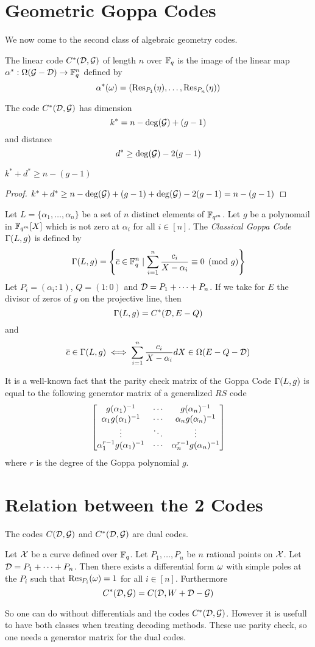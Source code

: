 \section{Geometric Goppa Codes}
We now come to the second class of algebraic geometry codes. 
\begin{definition}
	The linear code $C^*(\mathcal{D},\mathcal{G})$ of length $n$ over $\mathbb{F}_q$ is the image of the linear map $\alpha^*:\Omega(\mathcal{G}-\mathcal{D})\to \mathbb{F}_q^n$ defined by $$\alpha^*(\omega)=(\operatorname{Res}_{P_1}(\eta), \dots, \operatorname{Res}_{P_n}(\eta))$$
\end{definition}
\begin{theorem}
	The code $C^*(\mathcal{D},\mathcal{G})$ has dimension $$k^*=n-\deg(\mathcal{G})+(g-1)$$ and distance $$d^*\geq \deg(\mathcal{G})-2(g-1)$$
\end{theorem}
\begin{corollary}
	$k^*+d^*\geq n-(g-1)$
\end{corollary}
\begin{proof}
	$k^*+d^*\geq n-\deg(\mathcal{G})+(g-1)+\deg(\mathcal{G})-2(g-1)=n-(g-1)$
\end{proof}
\begin{example}
	Let $L=\{\alpha_1,\dots,\alpha_n\}$ be a set of $n$ distinct elements of $\mathbb{F}_{q^m}$. Let $g$ be a polynomail in $\mathbb{F}_{q^m}[X]$ which is not zero at $\alpha_i$ for all $i\in [n]$. The \textit{Classical Goppa Code} $\Gamma(L,g)$ is defined by $$\Gamma(L,g)=\left\{\overline{c}\in \mathbb{F}_q^n\mid \sum_{i=1}^n\frac{c_i}{X-\alpha_i}\equiv 0 \pmod{g}\right\}$$Let $P_i=(\alpha_i:1)$, $Q=(1:0)$ and $\mathcal{D}=P_1+\dots+P_n$. If we take for $E$ the divisor of zeros of $g$ on the projective line, then $$\Gamma(L,g)=C^*(\mathcal{D}, E-Q)$$ and $$\overline{c}\in \Gamma(L,g)\iff \sum_{i=1}^n\frac{c_i}{X-\alpha_i}dX\in \Omega(E-Q-\mathcal{D})$$
	
	It is a well-known fact that the parity check matrix of the Goppa Code $\Gamma(L,g)$ is equal to the following generator matrix of a generalized $RS$ code $$\left[\begin{matrix}g(\alpha_1)^{-1}  & \cdots & g(\alpha_n)^{-1}\\ \alpha_1g(\alpha_1)^{-1}  & \cdots & \alpha_ng(\alpha_n)^{-1}\\ \vdots & \ddots & \vdots \\ \alpha_1^{r-1}g(\alpha_1)^{-1}  & \cdots & \alpha_n^{r-1}g(\alpha_n)^{-1}\end{matrix}\right]$$where $r$ is the degree of the Goppa polynomial $g$.
\end{example}
\section{Relation between the 2 Codes}
\begin{theorem}
	The codes $C(\mathcal{D},\mathcal{G})$ and $C^*(\mathcal{D},\mathcal{G})$ are dual codes.
\end{theorem}
\begin{theorem}
	Let $\mathcal{X}$ be a curve defined over $\mathbb{F}_q$. Let $P_1,\dots, P_n$ be $n$ rational points on $\mathcal{X}$. Let $\mathcal{D}=P_1+\cdots+P_n$. Then there exists a differential form $\omega$ with simple poles at the $P_i$ such that $\operatorname{Res}_{P_i}(\omega)=1$ for all $i\in [n]$. Furthermore $$C^*(\mathcal{D},\mathcal{G})=C(\mathcal{D},W+\mathcal{D}-\mathcal{G})$$
\end{theorem}
So one can do without differentials and the codes $C^*(\mathcal{D},\mathcal{G})$. However it is usefull to have both classes when treating decoding methods. These use parity check, so one needs a generator matrix for the dual codes.

